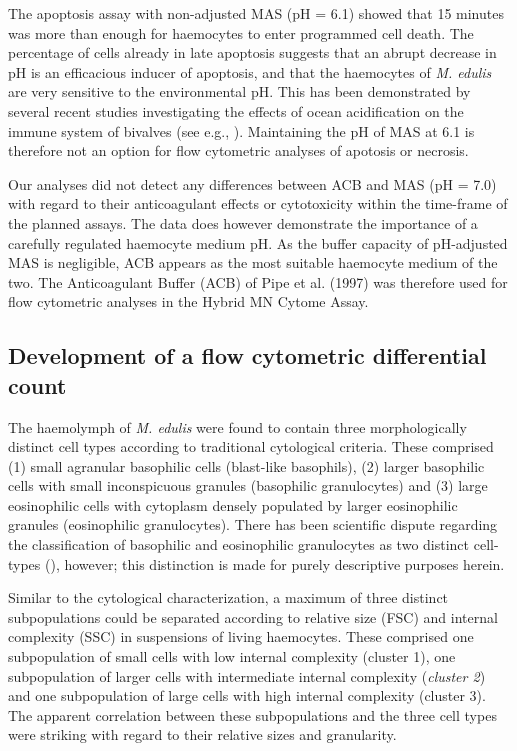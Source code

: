 The apoptosis assay with non-adjusted MAS (pH = 6.1) showed that 15 minutes was more than enough for haemocytes to enter programmed cell death. The percentage of cells already in late apoptosis suggests that an abrupt decrease in pH is an efficacious inducer of apoptosis, and that the haemocytes of \emph{M. edulis} are very sensitive to the environmental pH. This has been demonstrated by several recent studies investigating the effects of ocean acidification on the immune system of bivalves (see e.g., \cite{Wang2016, Dang2023}). Maintaining the pH of MAS at 6.1 is therefore not an option for flow cytometric analyses of apotosis or necrosis.

Our analyses did not detect any differences between ACB and MAS (pH = 7.0) with regard to their anticoagulant effects or cytotoxicity within the time-frame of the planned assays. The data does however demonstrate the importance of a carefully regulated haemocyte medium pH. As the buffer capacity of pH-adjusted MAS is negligible, ACB appears as the most suitable haemocyte medium of the two. The Anticoagulant Buffer (ACB) of Pipe et al. (1997) was therefore used for flow cytometric analyses in the Hybrid MN Cytome Assay.

\subsection{Development of a flow cytometric differential count}
The haemolymph of \emph{M. edulis} were found to contain three morphologically distinct cell types according to traditional cytological criteria. These comprised (1) small agranular basophilic cells (blast-like basophils), (2) larger basophilic cells with small inconspicuous granules (basophilic granulocytes) and (3) large eosinophilic cells with cytoplasm densely populated by larger eosinophilic granules (eosinophilic granulocytes). There has been scientific dispute regarding the classification of basophilic and eosinophilic granulocytes as two distinct cell-types (\cite{Cheng1980}), however; this distinction is made for purely descriptive purposes herein.

Similar to the cytological characterization, a maximum of three distinct subpopulations could be separated according to relative size (FSC) and internal complexity (SSC) in suspensions of living haemocytes. These comprised one subpopulation of small cells with low internal complexity (cluster 1), one subpopulation of larger cells with intermediate internal complexity (\emph{cluster 2}) and one subpopulation of large cells with high internal complexity (cluster 3). The apparent correlation between these subpopulations and the three cell types were striking with regard to their relative sizes and granularity.

